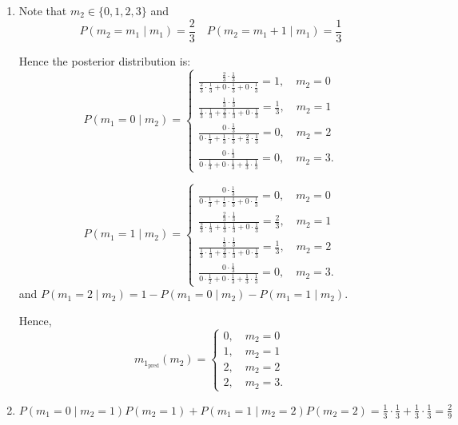 \documentclass[14pt]{extarticle}
\begin{document}
\begin{enumerate}
\item
Note that $m_2\in \{0,1,2,3\}$
and
\[
P(m_2=m_1 \mid m_1)=\frac{2}{3} \quad P(m_2=m_1+1 \mid m_1)=\frac{1}{3}
\]

Hence the posterior distribution is:
\[
P(m_1=0 \mid m_2)=
\begin{cases}
\frac{\frac{2}{3} \cdot \frac{1}{3}}{\frac{2}{3} \cdot \frac{1}{3} + 0 \cdot \frac{1}{3} + 0 \cdot \frac{1}{3}} = 1, \quad m_2 = 0\\
\frac{\frac{1}{3} \cdot \frac{1}{3}}{\frac{1}{3} \cdot \frac{1}{3} + \frac{2}{3} \cdot \frac{1}{3} + 0\cdot\frac{1}{3}} = \frac{1}{3},\quad m_2 = 1\\
\frac{0 \cdot \frac{1}{3}}{0 \cdot \frac{1}{3} + \frac{1}{3} \cdot \frac{1}{3} + \frac{2}{3} \cdot \frac{1}{3}} = 0,\quad m_2 = 2 \\
\frac{0 \cdot \frac{1}{3}}{0 \cdot \frac{1}{3} + 0\cdot \frac{1}{3} + \frac{1}{3} \cdot \frac{1}{3}} = 0,\quad m_2 = 3.
\end{cases}
\]

\[
P(m_1=1 \mid m_2)=
\begin{cases}
\frac{0 \cdot \frac{1}{3}}{0 \cdot \frac{1}{3} + \frac{1}{3} \cdot \frac{1}{3} + 0 \cdot \frac{1}{3}}=0, \quad m_2 = 0\\
\frac{\frac{2}{3} \cdot \frac{1}{3}}{\frac{2}{3} \cdot \frac{1}{3} + \frac{1}{3} \cdot \frac{1}{3}+0 \cdot \frac{1}{3}} = \frac{2}{3}, \quad m_2 = 1\\
\frac{\frac{1}{3} \cdot \frac{1}{3}}{\frac{1}{3} \cdot \frac{1}{3} + \frac{2}{3} \cdot \frac{1}{3}+0 \cdot \frac{1}{3}} = \frac{1}{3}, \quad m_2 = 2\\
\frac{0 \cdot \frac{1}{3}}{0 \cdot \frac{1}{2} + 0 \cdot \frac{1}{3} + \frac{1}{3} \cdot \frac{1}{3}} = 0, \quad m_2 = 3.
\end{cases}
\]
and $P(m_1=2 \mid m_2)=1-P(m_1=0 \mid m_2)-P(m_1=1 \mid m_2)$.

Hence,
\[
m_{\mathrm{1_{pred}}}
(m_2)=
\begin{cases}
0,\quad m_2 = 0\\
1,\quad m_2 = 1\\
2,\quad m_2=2 \\
2,\quad m_2=3. 
\end{cases} 
\]

\item
$
P(m_1=0 \mid m_2=1)P(m_2=1) + P(m_1=1 \mid m_2=2) P(m_2=2) = \frac{1}{3} \cdot \frac{1}{3} + \frac{1}{3} \cdot \frac{1}{3} = \frac{2}{9}
$

\end{enumerate}
\end{document}
